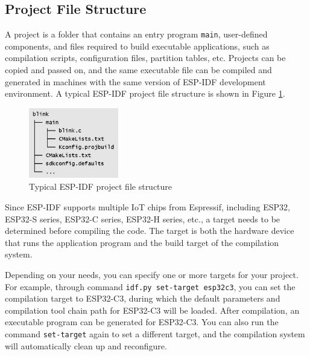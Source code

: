 \documentclass[a4paper,12pt,openany]{book}
\begin{document}
\subsection{Project File Structure}
A project is a folder that contains an entry program \verb|main|, user-defined components, and files required to build executable applications, such as compilation scripts, configuration files, partition tables, etc. Projects can be copied and passed on, and the same executable file can be compiled and generated in machines with the same version of ESP-IDF development environment. A typical ESP-IDF project file structure is shown in Figure \ref{Typical ESP-IDF project file structure}.

\begin{figure}[h!]
    \centering
    \includegraphics[width=0.35\textwidth]{D4Z/4-15}
    \caption{Typical ESP-IDF project file structure}
    \label{Typical ESP-IDF project file structure}
\end{figure}

Since ESP-IDF supports multiple IoT chips from Espressif, including ESP32, ESP32-S series, ESP32-C series, ESP32-H series, etc., a target needs to be determined before compiling the code. The target is both the hardware device that runs the application program and the build target of the compilation system.

Depending on your needs, you can specify one or more targets for your project. For example, through command \verb|idf.py set-target esp32c3|, you can set the compilation target to ESP32-C3, during which the default parameters and compilation tool chain path for ESP32-C3 will be loaded. After compilation, an executable program can be generated for ESP32-C3. You can also run the command \verb|set-target| again to set a different target, and the compilation system will automatically clean up and reconfigure.
\end{document}
